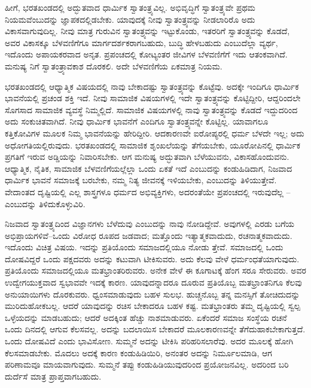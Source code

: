 ಹೀಗೆ, ಭರತಖಂಡದಲ್ಲಿ ಅದ್ಭುತವಾದ ಧಾರ್ಮಿಕ ಸ್ವಾತಂತ್ರ್ಯವಿಲ್ಲ. ಅಭಿವೃದ್ಧಿಗೆ ಸ್ವಾತಂತ್ರ್ಯವೇ ಪ್ರಥಮ ನಿಯಮವೆಂಬುದನ್ನು ಜ್ಞಾಪಕದಲ್ಲಿಡಬೇಕು. ಯಾವುದಕ್ಕೆ ನೀವು ಸ್ವಾತಂತ್ರ್ಯವನ್ನು ನೀಡಲಾರಿರೊ ಅದು ವಿಕಾಸವಾಗುವುದಿಲ್ಲ. ನೀವು ಮಾತ್ರ ಗುರುವಿನ ಸ್ವಾತಂತ್ರ್ಯವನ್ನು ಇಟ್ಟುಕೊಂಡು, ಇತರರಿಗೆ ಸ್ವಾತಂತ್ರ್ಯವನ್ನು ಕೊಡದೆ, ಅವರ ವಿಕಾಸಕ್ಕೂ ಬೆಳವಣಿಗೆಗೂ ಮಾರ್ಗದರ್ಶಕರಾಗಬಹುದು, ಬುದ್ಧಿ ಹೇಳಬಹುದು ಎಂಬುದೆಲ್ಲಾ ವ್ಯರ್ಥ, ಇದೊಂದು ಅಪಾಯಕರವಾದ ಅನೃತ. ಪ್ರಪಂಚದಲ್ಲಿ ಕೋಟ್ಯಂತರ ಜೀವಿಗಳ ಬೆಳವಣಿಗೆಗೆ ಇದು ಆತಂಕವಾಗಿದೆ. ಮನುಷ್ಯ ನಿಗೆ ಸ್ವಾತಂತ್ರ್ಯಾವಕಾಶ ದೊರಕಲಿ. ಅದೇ ಬೆಳವಣಿಗೆಯ ಏಕಮಾತ್ರ ನಿಯಮ.

ಭರತಖಂಡದಲ್ಲಿ ಆಧ್ಯಾತ್ಮಿಕ ವಿಷಯದಲ್ಲಿ ನಾವು ಬೇಕಾದಷ್ಟು ಸ್ವಾತಂತ್ರ್ಯವನ್ನು ಕೊಟ್ಟೆವು. ಅದಕ್ಕೇ ಇಂದಿಗೂ ಧಾರ್ಮಿಕ ಭಾವನೆಯಲ್ಲಿ ಪ್ರಚಂಡ ಶಕ್ತಿ ಇದೆ. ನೀವು ಸಾಮಾಜಿಕ ವಿಷಯಗಳಲ್ಲಿ ಇದೇ ಸ್ವಾತಂತ್ರ್ಯವನ್ನು ಕೊಟ್ಟಿದ್ದೀರಿ, ಆದ್ದರಿಂದಲೇ ಸೊಗಸಾದ ಸಾಮಾಜಿಕ ವ್ಯವಸ್ಥೆ ನಿಮ್ಮಲ್ಲಿದೆ. ಸಾಮಾಜಿಕ ವಿಷಯಗಳಲ್ಲಿ ನಾವು ಸ್ವಾತಂತ್ರ್ಯವನ್ನು ಕೊಡದೆ ಇದ್ದುದರಿಂದ ಅದು ಸಂಕುಚಿತವಾಗಿದೆ. ನೀವು ಧಾರ್ಮಿಕ ಭಾವನೆಗೆ ಎಂದಿಗೂ ಸ್ವಾತಂತ್ರ್ಯವನ್ನೇ ಕೊಟ್ಟಿಲ್ಲ. ಯಾವಾಗಲೂ ಕತ್ತಿಕೋವಿಗಳ ಮೂಲಕ ನಿಮ್ಮ ಭಾವನೆಯನ್ನು ಹೇರಿದ್ದೀರಿ. ಆದಕಾರಣವೇ ಐರೋಪ್ಯರಲ್ಲಿ ಧರ್ಮ ಬೆಳದೇ ಇಲ್ಲ; ಅದು ಅಧೋಗತಿಯಲ್ಲಿರುವುದು. ಭರತಖಂಡದಲ್ಲಿ ಸಾಮಾಜಿಕ ಶೃಂಖಲೆಯನ್ನು ತೆಗೆಯಬೇಕು, ಯೂರೋಪಿನಲ್ಲಿ ಧಾರ್ಮಿಕ ಪ್ರಗತಿಗೆ ಇರುವ ಅಡ್ಡಿಯನ್ನು ನಿವಾರಿಸಬೇಕು. ಆಗ ಮನುಷ್ಯ ಅದ್ಭುತವಾಗಿ ಬೆಳೆಯುವನು, ವಿಕಾಸಹೊಂದುವನು. ಆಧ್ಯಾತ್ಮಿಕ, ನೈತಿಕ, ಸಾಮಾಜಿಕ ಬೆಳವಣಿಗೆಯಲ್ಲೆಲ್ಲಾ ಒಂದು ಏಕತೆ ಇದೆ ಎಂಬುದನ್ನು ಕಂಡುಹಿಡಿದಾಗ, ನಿಜವಾದ ಧಾರ್ಮಿಕ ಭಾವನೆ ಸಮಾಜಕ್ಕೆ ಬರಬೇಕು, ನಮ್ಮ ನಿತ್ಯ ಜೀವನಕ್ಕೆ ಇಳಿಯಬೇಕು, ಎಂಬುದನ್ನು ತಿಳಿಯುತ್ತೇವೆ. ವೇದಾಂತದ ದೃಷ್ಟಿಯಲ್ಲಿ ಎಲ್ಲ ಶಾಸ್ತ್ರಗಳೂ ಧರ್ಮದ ಅಭಿವ್ಯಕ್ತಿಗಳು, ಅದರಂತೆಯೇ ಪ್ರಪಂಚದಲ್ಲಿ ಇರುವುದೆಲ್ಲ – ಎಂಬುದನ್ನು ತಿಳಿದುಕೊಳ್ಳುವಿರಿ.

ನಿಜವಾದ ಸ್ವಾತಂತ್ರ್ಯದಿಂದ ವಿಜ್ಞಾನಗಳು ಬೆಳೆದುವು ಎಂಬುದನ್ನು ನಾವು ನೋಡಿದ್ದೇವೆ. ಅವುಗಳಲ್ಲಿ ಎರಡು ಬಗೆಯ ಅಭಿಪ್ರಾಯಗಳಿವೆ–ಒಂದು ವಿರೋಧ ರೂಪದ ಜಡವಾದ; ಮತ್ತೊಂದು ಇತ್ಯಾತ್ಮಕವಾದುದು, ರಚನಾತ್ಮಕವಾದುದು. ಇದೊಂದು ವಿಚಿತ್ರ ವಿಷಯ. ಇದನ್ನು ಪ್ರತಿಯೊಂದು ಸಮಾಜದಲ್ಲಿಯೂ ನೋಡು ತ್ತೇವೆ. ಸಮಾಜದಲ್ಲಿ ಒಂದು ದೋಷವಿದ್ದರೆ ಒಂದು ಪಕ್ಷದವರು ಅದನ್ನು ಕಟುವಾಗಿ ಟೀಕಿಸುವರು. ಅದು ಕೆಲವು ವೇಳೆ ಧರ್ಮಂಧತೆಯಾಗುವುದು. ಪ್ರತಿಯೊಂದು ಸಮಾಜದಲ್ಲಿಯೂ ಮತಭ್ರಾಂತರಿರುವರು. ಅನೇಕ ವೇಳೆ ಈ ಕೂಗಾಟಕ್ಕೆ ಹೆಂಗ ಸರೂ ಸೇರುವರು. ಅವರ ಉದ್ವೇಗಯುಕ್ತವಾದ ಸ್ವಭಾವವೇ ಇದಕ್ಕೆ ಕಾರಣ. ಯಾವುದನ್ನಾದರೂ ದೂರುವ ಪ್ರತಿಯೊಬ್ಬ ಮತಭ್ರಾಂತನಿಗೂ ಕೆಲವು ಅನುಯಾಯಿಗಳು ದೊರಕುವರು. ಧ್ವಂಸಮಾಡುವುದು ಬಹಳ ಸುಲಭ. ಹುಚ್ಚನೊಬ್ಬ ತನ್ನ ಮನಸ್ಸಿಗೆ ತೋಚಿದುದನ್ನು ಮುರಿದುಹೋಕಬಲ್ಲ. ಆದರೆ ಯಾವುದನ್ನು ರಚಿಸ ಬೇಕಾದರೂ ಬಹಳ ಕಷ್ಟ. ಮತಭ್ರಾಂತರು ತಮ್ಮ ದೃಷ್ಟಿಯಲ್ಲಿ ಸ್ವಲ್ಪ ಒಳ್ಳೆಯದನ್ನು ಮಾಡಬಹುದು; ಆದರೆ ಅದಕ್ಕಿಂತ ಹೆಚ್ಚು ನಾಶಮಾಡುವರು. ಏಕೆಂದರೆ ಸಮಾಜ ಸಂಸ್ಥೆಯ ರಚನೆ ಒಂದು ದಿನದಲ್ಲಿ ಆಗುವ ಕೆಲಸವಲ್ಲ. ಅದನ್ನು ಬದಲಾಯಿಸ ಬೇಕಾದರೆ ಮೂಲಕಾರಣವನ್ನೇ ತೆಗೆದುಹಾಕಬೇಕಾಗುತ್ತದೆ. ಒಂದು ದೋಷವಿದೆ ಎಂದು ಭಾವಿಸೋಣ. ಸುಮ್ಮನೆ ಅದನ್ನು ಟೀಕಿಸಿ ಪರಿಹರಿಸಲಾರೆವು. ಅದರ ಮೂಲಕ್ಕೆ ಹೋಗಿ ಕೆಲಸಮಾಡಬೇಕು. ಮೊದಲು ಅದಕ್ಕೆ ಕಾರಣ ಕಂಡುಹಿಡಿಯಿರಿ, ಅನಂತರ ಅದನ್ನು ನಿರ್ಮೂಲಮಾಡಿ, ಆಗ ಪರಿಣಾಮವೂ ಮಾಯವಾಗುವುದು. ಸುಮ್ಮನೆ ತಪ್ಪು ಕಂಡುಹಿಡಿಯುವುದರಿಂದ ಪ್ರಯೋಜನವಿಲ್ಲ. ಅದರಿಂದ ಬರಿ ದುರ್ದೆಸೆ ಮಾತ್ರ ಪ್ರಾಪ್ತವಾಗಬಹುದು.

